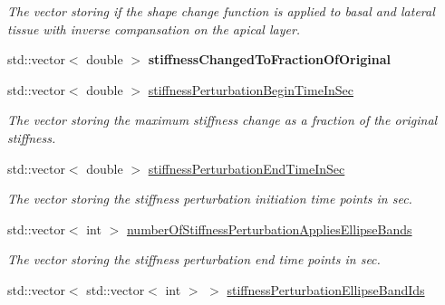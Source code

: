 \begin{DoxyCompactItemize}
\begin{DoxyCompactList}\small\item\em The vector storing if the shape change function is applied to basal and lateral tissue with inverse compansation on the apical layer. \end{DoxyCompactList}\item 
\hypertarget{classSimulation_aa6f298f7f7ae41fcd197f17a6134603f}{}std\+::vector$<$ double $>$ {\bfseries stiffness\+Changed\+To\+Fraction\+Of\+Original}\label{classSimulation_aa6f298f7f7ae41fcd197f17a6134603f}

\item 
\hypertarget{classSimulation_a36cfc7d8043d1dad55751cf184bcb2b8}{}std\+::vector$<$ double $>$ \hyperlink{classSimulation_a36cfc7d8043d1dad55751cf184bcb2b8}{stiffness\+Perturbation\+Begin\+Time\+In\+Sec}\label{classSimulation_a36cfc7d8043d1dad55751cf184bcb2b8}

\begin{DoxyCompactList}\small\item\em The vector storing the maximum stiffness change as a fraction of the original stiffness. \end{DoxyCompactList}\item 
\hypertarget{classSimulation_a8b9dfbe4a63693a6cfdccfe9c0ee4771}{}std\+::vector$<$ double $>$ \hyperlink{classSimulation_a8b9dfbe4a63693a6cfdccfe9c0ee4771}{stiffness\+Perturbation\+End\+Time\+In\+Sec}\label{classSimulation_a8b9dfbe4a63693a6cfdccfe9c0ee4771}

\begin{DoxyCompactList}\small\item\em The vector storing the stiffness perturbation initiation time points in sec. \end{DoxyCompactList}\item 
std\+::vector$<$ int $>$ \hyperlink{classSimulation_ae03ad5c7859265aa5eb4d03d2e1f73d1}{number\+Of\+Stiffness\+Perturbation\+Applies\+Ellipse\+Bands}
\begin{DoxyCompactList}\small\item\em The vector storing the stiffness perturbation end time points in sec. \end{DoxyCompactList}\item 
\hypertarget{classSimulation_a95d68493a45f2d2cd22c2e757124bd81}{}std\+::vector$<$ std\+::vector$<$ int $>$ $>$ \hyperlink{classSimulation_a95d68493a45f2d2cd22c2e757124bd81}{stiffness\+Perturbation\+Ellipse\+Band\+Ids}\label{classSimulation_a95d68493a45f2d2cd22c2e757124bd81}


\end{DoxyCompactItemize}
